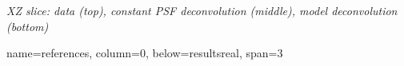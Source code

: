 \documentclass[a0paper,portrait,fontscale=0.35]{baposter}
\newcommand{\mycaption}[1]{
  {
    \smaller
    \emph{#1}
  }
}
\theoremstyle{plain}
\theoremstyle{plain}
\theoremstyle{definition}
\theoremstyle{plain}
\theoremstyle{definition}
\begin{document}
\begin{poster}
{\begin{minipage}[t]{0.48\textwidth}
\begin{minipage}[t]{0.49\textwidth}
      \vspace{-0.5em}
      \centering

      \vspace{-1em}
      \begin{center}
        \mycaption{
          XZ slice: data (top), constant PSF deconvolution (middle),
          model deconvolution (bottom)
        }
      \end{center}
    \end{minipage}
  \end{minipage}
  \vspace{-1em}
}

{name=references, column=0,  below=resultsreal, span=3}
{
  \tiny
  \renewcommand{\section}[2]{\vspace{0.05em}}	%
  
}


\end{poster}
\end{document}

